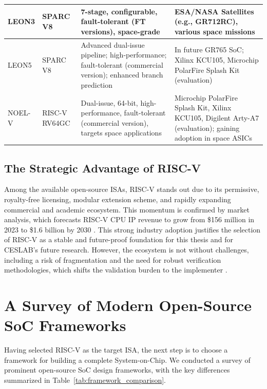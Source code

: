 \begin{longtable}{p{2.35cm}|p{2.7cm}|p{6cm}|p{3.5cm}}
    \hline
    LEON3 \cite{gaisler_leon3_product} & SPARC V8 & 7-stage, configurable, fault-tolerant (FT versions), space-grade & ESA/NASA Satellites (e.g., GR712RC), various space missions \\
    \hline
    LEON5 \cite{gaisler_leon5_product} & SPARC V8 & Advanced dual-issue pipeline; high-performance; fault-tolerant (commercial version); enhanced branch prediction & In future GR765 SoC; Xilinx KCU105, Microchip PolarFire Splash Kit (evaluation) \\
    \hline
    NOEL-V \cite{gaisler_noel_v_product} & RISC-V RV64GC & Dual-issue, 64-bit, high-performance, fault-tolerant (commercial version), targets space applications & Microchip PolarFire Splash Kit, Xilinx KCU105, Digilent Arty-A7 (evaluation); gaining adoption in space ASICs \\ \bottomrule \end{longtable}

\subsection{The Strategic Advantage of RISC-V}

Among the available open-source ISAs, RISC-V stands out due to its permissive, royalty-free licensing, modular extension scheme, and rapidly expanding commercial and academic ecosystem. This momentum is confirmed by market analysis, which forecasts RISC-V CPU IP revenue to grow from \$156 million in 2023 to \$1.6 billion by 2030 \cite{shd_group_report}. This strong industry adoption justifies the selection of RISC-V as a stable and future-proof foundation for this thesis and for CESLAB's future research. However, the ecosystem is not without challenges, including a risk of fragmentation and the need for robust verification methodologies, which shifts the validation burden to the implementer \cite{jia2014survey,survey_openrisc_fpga_pdf,softcores_isec,tong2006soft}.

\section{A Survey of Modern Open-Source SoC Frameworks}

Having selected RISC-V as the target ISA, the next step is to choose a framework for building a complete System-on-Chip. We conducted a survey of prominent open-source SoC design frameworks, with the key differences summarized in Table~\ref{tab:framework_comparison}.

